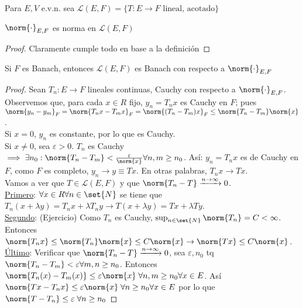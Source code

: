 \documentclass{notetaking}
\begin{document}
\begin{defn}
    Para \(E,V\) e.v.n. sea \(\mathcal{L}(E,F)=\{T:E\rightarrow F\text{ lineal, acotado}\}\)
\end{defn}

\begin{prp}
    \(\norm{\cdot}_{E,F}\) es norma en \(\mathcal{L}(E,F)\)
\end{prp}
\begin{proof}
    Claramente cumple todo en base a la definición
\end{proof}

\begin{prp}
    Si \(F\) es Banach, entonces \(\mathcal{L}(E,F)\) es Banach con  respecto a \(\norm{\cdot}_{E,F}\)
\end{prp}
\begin{proof}
    Sean \(T_n:E\rightarrow F\) lineales continuas, Cauchy con respecto a \(\norm{\cdot}_{E,F}\). Observemos que, para cada \(x\in R\)  fijo, \(y_n=T_nx\) es Cauchy en \(F\); pues \(\norm{y_n-y_m}_F=\norm{T_nx-T_mx}_F=\norm{(T_n-T_m)x}_F\leq\norm{T_n-T_m}\norm{x}\).\\
    Si \(x=0\), \(y_n\) es constante, por lo que es Cauchy.\\
    Si \(x\neq0\), sea \(\varepsilon>0\). \(T_n\) es Cauchy \(\implies\exists n_0:\norm{T_n-T_m}<\frac{\varepsilon}{\norm{x}}\forall n,m\geq n_0\). Así: \(y_n=T_nx\) es de Cauchy en \(F\), como \(F\) es completo, \(y_n\rightarrow y\equiv Tx\). En otras palabras, \(T_nx\rightarrow Tx\).\\
    Vamos a ver que \(T\in\mathcal{L}(E,F)\) y que \(\norm{T_n-T}\xrightarrow{n\rightarrow\infty}0\).\\
    \underline{Primero}: \(\forall x\in R\forall n\in\set{N}\) se tiene que \(T_n(x+\lambda y)=T_nx+\lambda T_ny\rightarrow T(x+\lambda y)=Tx+\lambda Ty\).\\
    \underline{Segundo}: (Ejercicio) Como \(T_n\) es Cauchy, \(\sup_{n\in\set{N}}\norm{T_n}=C<\infty\). Entonces \(\norm{T_nx}\leq\norm{T_n}\norm{x}\leq C\norm{x}\rightarrow\norm{Tx}\leq C\norm{x}\).\\
    \underline{Último}: Verificar que \(\norm{T_n-T}\xrightarrow{n\rightarrow\infty}0\), sea \(\varepsilon, n_0\) tq \(\norm{T_n-T_m}<\varepsilon\forall m,n\geq n_0\). Entonces \(\norm{T_n(x)-T_m(x)}\leq\varepsilon\norm{x}\;\forall n,m\geq n_0\forall x\in E\). Así \(\norm{Tx-T_nx}\leq\varepsilon\norm{x}\;\forall n\geq n_0\forall x\in E\) por lo que \(\norm{T-T_n}\leq\varepsilon\;\forall n\geq n_0\)
\end{proof}
\end{document}
